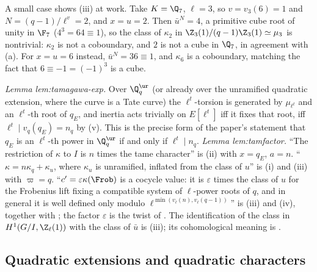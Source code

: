 A small case shows (iii) at work. Take $K=\Q_7$, $\ell=3$, so $v=v_3(6)=1$ and $N=(q-1)/\ell^v=2$, and $x=u=2$. Then $\bar u^N=4$, a primitive cube root
of unity in $\F_7$ ($4^3=64\equiv1$), so the class of $\kappa_2$ in $\Z_3(1)/(q-1)\Z_3(1)\simeq\mu_3$ is nontrivial: $\kappa_2$ is not a coboundary, and $2$ is not
a cube in $\Q_7$, in agreement with (a). For $x=u=6$ instead, $\bar u^N=36\equiv1$, and $\kappa_6$ is a coboundary, matching
the fact that $6\equiv-1=(-1)^3$ is a cube.

\begin{paperlink}\label{pl:local:kummer}
\emph{Lemma lem:tamagawa-exp.} Over $\Q_q^{\ur}$ (or already over the unramified quadratic extension, where the curve is a Tate curve) the
$\ell^t$-torsion is generated by $\mu_{\ell^t}$ and an $\ell^t$-th root of $q_E$, and inertia acts trivially on $E[\ell^t]$ iff it fixes that root, iff
$\ell^t\mid v_q(q_E)=n_q$ by (v). This is the precise form of the paper's statement that $q_E$ is an $\ell^t$-th power in $\Q_q^{\ur}$ if and only if
$\ell^t\mid n_q$. \emph{Lemma lem:tamfactor.} ``The restriction of $\kappa$ to $I$ is $n$ times the tame character'' is
(ii) with $x=q_E$, $a=n$. ``$\kappa=n\kappa_q+\kappa_u$, where $\kappa_u$ is unramified, inflated from the class of $u$'' is (i) and
(iii) with $\varpi=q$. ``$c'=\varepsilon\kappa(\Frob)$ is a cocycle value: it is $\varepsilon$ times the class of $u$ for the Frobenius lift fixing a compatible system of
$\ell$-power roots of $q$, and in general it is well defined only modulo $\ell^{\min(v_\ell(n),v_\ell(q-1))}$'' is (iii) and (iv), together with
; the factor $\varepsilon$ is the twist of . The identification of the class in
$H^1(G/I,\Z_\ell(1))$ with the class of $\bar u$ is (iii); its cohomological meaning is .
\end{paperlink}

\subsection{Quadratic extensions and quadratic characters}


